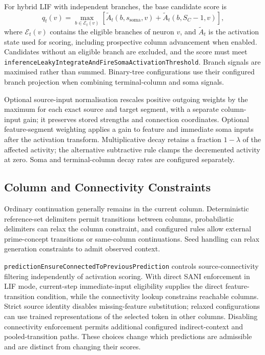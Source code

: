For hybrid LIF with independent branches, the base candidate score is
\[
	q_t(v)=\max_{b\in\mathcal{E}_t(v)}\left[\widetilde A_t(b,s_{\mathrm{soma}},v)+\widetilde A_t(b,S_C-1,v)\right],
\]
where $\mathcal{E}_t(v)$ contains the eligible branches of neuron $v$, and $\widetilde A_t$ is the activation state used for scoring, including prospective column advancement when enabled. Candidates without an eligible branch are excluded, and the score must meet \texttt{inferenceLeakyIntegrateAndFireSomaActivationThreshold}. Branch signals are maximised rather than summed. Binary-tree configurations use their configured branch projection when combining terminal-column and soma signals.

Optional source-input normalisation rescales positive outgoing weights by the maximum for each exact source and target segment, with a separate column-input gain; it preserves stored strengths and connection coordinates. Optional feature-segment weighting applies a gain to feature and immediate soma inputs after the activation transform. Multiplicative decay retains a fraction $1-\lambda$ of the affected activity; the alternative subtractive rule clamps the decremented activity at zero. Soma and terminal-column decay rates are configured separately.

\subsection{Column and Connectivity Constraints}
Ordinary continuation generally remains in the current column. Deterministic reference-set delimiters permit transitions between columns, probabilistic delimiters can relax the column constraint, and configured rules allow external prime-concept transitions or same-column continuations. Seed handling can relax generation constraints to admit observed context.

\texttt{predictionEnsureConnectedToPreviousPrediction} controls source-connectivity filtering independently of activation scoring. With direct SANI enforcement in LIF mode, current-step immediate-input eligibility supplies the direct feature-transition condition, while the connectivity lookup constrains reachable columns. Strict source identity disables missing-feature substitution; relaxed configurations can use trained representations of the selected token in other columns. Disabling connectivity enforcement permits additional configured indirect-context and pooled-transition paths. These choices change which predictions are admissible and are distinct from changing their scores.

